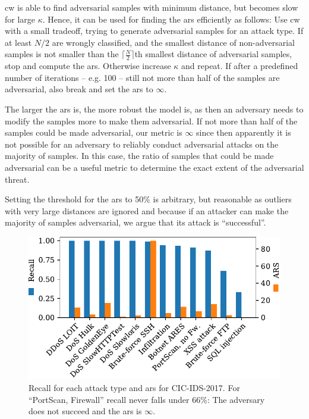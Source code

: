 \documentclass[conference]{IEEEtran}
\begin{document}
\gls{cw} is able to find adversarial samples with minimum distance, but becomes slow for large $\kappa$. Hence, it can be used for finding the \gls{ars} efficiently as follows: 
Use \gls{cw} with a small tradeoff, trying to generate adversarial samples for an attack type. If %
 at least $N/2$  are wrongly classified, and
 the smallest distance of non-adversarial samples is not smaller than the $\lceil\frac{N}{2}\rceil$th smallest distance of adversarial samples,
stop and compute the \gls{ars}. Otherwise increase $\kappa$ and repeat. If after a predefined number of iterations -- e.g. 100 -- still not more than half of the samples are adversarial, also break and set the \gls{ars} to $\infty$.

The larger the \gls{ars} is, the more robust the model is, as then an adversary needs to modify the samples more to make them adversarial. If not more than half of the samples could be made adversarial, our metric is $\infty$ since then apparently it is not possible for an adversary to reliably conduct adversarial attacks on the majority of samples. In this case, the ratio of samples that could be made adversarial can be a useful metric to determine the exact extent of the adversarial threat.

Setting the threshold for the \gls{ars} to 50\% is arbitrary, but
 reasonable as outliers with very large distances are ignored and because if an attacker can make the majority of samples adversarial, we argue that its attack is ``successful''.

\begin{figure}[h]
\includegraphics[width=\columnwidth]{../plots/ars_original.pdf}
\caption{Recall for each attack type and \gls{ars} for CIC-IDS-2017. For ``PortScan, Firewall'' recall never falls under 66\%: The adversary does not succeed and the \gls{ars} is $\infty$.}
\label{fig:recall_ars}
\end{figure}
\end{document}
